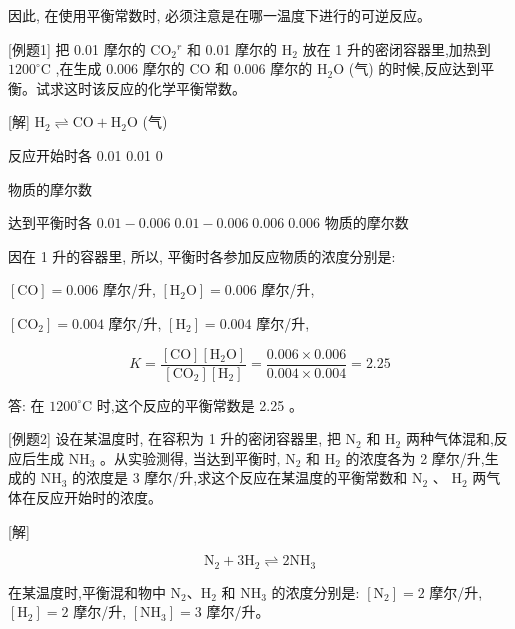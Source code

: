 \documentclass[10pt]{article}
\begin{document}
因此, 在使用平衡常数时, 必须注意是在哪一温度下进行的可逆反应。

[例题1] 把 0.01 摩尔的 \({\mathrm{{CO}}}_{2}{}^{r}\) 和 0.01 摩尔的 \({\mathrm{H}}_{2}\) 放在 1 升的密闭容器里,加热到 \({1200}^{ \circ }\mathrm{C}\) ,在生成 0.006 摩尔的 \(\mathrm{{CO}}\) 和 0.006 摩尔的 \({\mathrm{H}}_{2}\mathrm{O}\) (气) 的时候,反应达到平衡。试求这时该反应的化学平衡常数。

[解] \({\mathrm{H}}_{2} \rightleftharpoons \mathrm{{CO}} + {\mathrm{H}}_{2}\mathrm{O}\) (气)

反应开始时各 0.01 0.01 0

物质的摩尔数

达到平衡时各 \({0.01} - {0.006}\;{0.01} - {0.006}\;{0.006}\;{0.006}\) 物质的摩尔数

因在 1 升的容器里, 所以, 平衡时各参加反应物质的浓度分别是:

\(\left\lbrack \mathrm{{CO}}\right\rbrack = {0.006}\) 摩尔/升, \(\left\lbrack {{\mathrm{H}}_{2}\mathrm{O}}\right\rbrack = {0.006}\) 摩尔/升,

\(\left\lbrack {\mathrm{{CO}}}_{2}\right\rbrack = {0.004}\) 摩尔/升, \(\left\lbrack {\mathrm{H}}_{2}\right\rbrack = {0.004}\) 摩尔/升,

\[
K = \frac{\left\lbrack \mathrm{{CO}}\right\rbrack \left\lbrack {{\mathrm{H}}_{2}\mathrm{O}}\right\rbrack }{\left\lbrack {\mathrm{{CO}}}_{2}\right\rbrack \left\lbrack {\mathrm{H}}_{2}\right\rbrack } = \frac{{0.006} \times {0.006}}{{0.004} \times {0.004}} = {2.25}
\]

答: 在 \({1200}^{ \circ }\mathrm{C}\) 时,这个反应的平衡常数是 2.25 。

[例题2] 设在某温度时, 在容积为 1 升的密闭容器里, 把 \({\mathrm{N}}_{2}\) 和 \({\mathrm{H}}_{2}\) 两种气体混和,反应后生成 \({\mathrm{{NH}}}_{3}\) 。从实验测得, 当达到平衡时, \({\mathrm{N}}_{2}\) 和 \({\mathrm{H}}_{2}\) 的浓度各为 2 摩尔/升,生成的 \({\mathrm{{NH}}}_{3}\) 的浓度是 3 摩尔/升,求这个反应在某温度的平衡常数和 \({\mathrm{N}}_{2}\) 、 \({\mathrm{H}}_{2}\) 两气体在反应开始时的浓度。

[解]

\[
{\mathrm{N}}_{2} + 3{\mathrm{H}}_{2} \rightleftharpoons 2{\mathrm{{NH}}}_{3}
\]

在某温度时,平衡混和物中 \({\mathrm{N}}_{2}\text{、}{\mathrm{H}}_{2}\) 和 \({\mathrm{{NH}}}_{3}\) 的浓度分别是: \(\left\lbrack {\mathrm{N}}_{2}\right\rbrack = 2\) 摩尔/升, \(\left\lbrack {\mathrm{H}}_{2}\right\rbrack = 2\) 摩尔/升, \(\left\lbrack {\mathrm{{NH}}}_{3}\right\rbrack = 3\) 摩尔/升。
\end{document}
